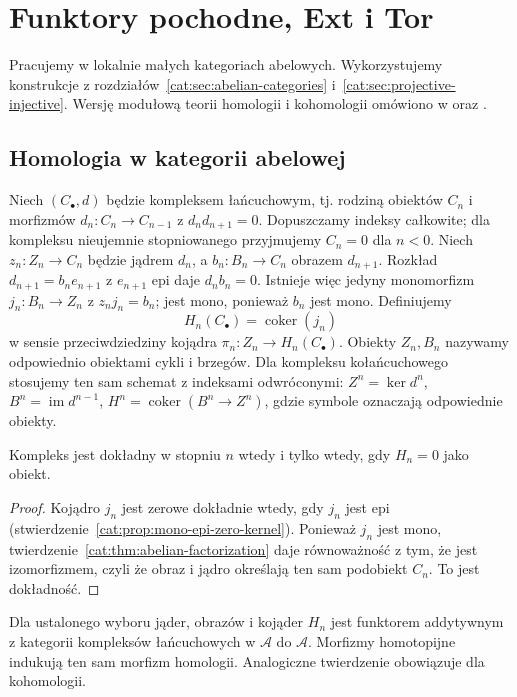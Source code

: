 \section{Funktory pochodne, Ext i Tor}\label{cat:sec:derived-functors}
Pracujemy w lokalnie małych kategoriach abelowych. Wykorzystujemy konstrukcje z rozdziałów~\ref{cat:sec:abelian-categories} i~\ref{cat:sec:projective-injective}. Wersję modułową teorii homologii i kohomologii omówiono w  oraz .

\subsection{Homologia w kategorii abelowej}
\begin{definicja}\label{cat:def:abelian-homology}
Niech $(C_\bullet,d)$ będzie kompleksem łańcuchowym, tj. rodziną obiektów $C_n$ i morfizmów $d_n:C_n\to C_{n-1}$ z $d_nd_{n+1}=0$. Dopuszczamy indeksy całkowite; dla kompleksu nieujemnie stopniowanego przyjmujemy $C_n=0$ dla $n<0$. Niech $z_n:Z_n\to C_n$ będzie jądrem $d_n$, a $b_n:B_n\to C_n$ obrazem $d_{n+1}$. Rozkład $d_{n+1}=b_ne_{n+1}$ z $e_{n+1}$ epi daje $d_nb_n=0$. Istnieje więc jedyny monomorfizm $j_n:B_n\to Z_n$ z $z_nj_n=b_n$; jest mono, ponieważ $b_n$ jest mono. Definiujemy
\[
 H_n(C_\bullet)=\operatorname{coker}(j_n)
\]
w sensie przeciwdziedziny kojądra $\pi_n:Z_n\to H_n(C_\bullet)$. Obiekty $Z_n,B_n$ nazywamy odpowiednio obiektami cykli i brzegów. Dla kompleksu kołańcuchowego stosujemy ten sam schemat z indeksami odwróconymi: $Z^n=\ker d^n$, $B^n=\operatorname{im}d^{n-1}$, $H^n=\operatorname{coker}(B^n\to Z^n)$, gdzie symbole oznaczają odpowiednie obiekty.
\end{definicja}
\begin{stwierdzenie}\label{cat:prop:homology-zero}
Kompleks jest dokładny w stopniu $n$ wtedy i tylko wtedy, gdy $H_n=0$ jako obiekt.
\end{stwierdzenie}
\begin{proof}
Kojądro $j_n$ jest zerowe dokładnie wtedy, gdy $j_n$ jest epi (stwierdzenie~\ref{cat:prop:mono-epi-zero-kernel}). Ponieważ $j_n$ jest mono, twierdzenie~\ref{cat:thm:abelian-factorization} daje równoważność z tym, że jest izomorfizmem, czyli że obraz i jądro określają ten sam podobiekt $C_n$. To jest dokładność.
\end{proof}
\begin{twierdzenie}\label{cat:thm:abelian-homology-functor}
Dla ustalonego wyboru jąder, obrazów i kojąder $H_n$ jest funktorem addytywnym z kategorii kompleksów łańcuchowych w $\mathcal A$ do $\mathcal A$. Morfizmy homotopijne indukują ten sam morfizm homologii. Analogiczne twierdzenie obowiązuje dla kohomologii.
\end{twierdzenie}
